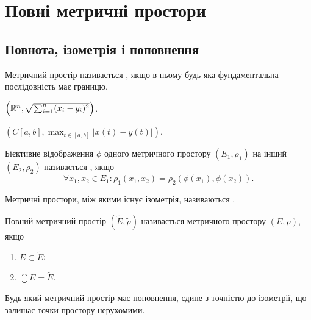 \chapter{Повні метричні простори}

\section{Повнота, ізометрія і поповнення}

\begin{definition}
Метричний простір називається , якщо
в ньому будь-яка фундаментальна послідовність має
границю.
\end{definition}

\begin{example}
$\left( \mathbb{R}^n, \sqrt{\sum_{i = 1}^n (x_i - y_i)^2} \right)$.
\end{example}

\begin{example}
$\left( C[a, b], \max_{t \in [a, b]} |x(t) - y(t)| \right)$.
\end{example}

\begin{definition}
Бієктивне відображення $\phi$ одного метричного
простору $(E_1, \rho_1)$ на інший $(E_2, \rho_2)$ називається
, якщо
\begin{equation*}
    \forall x_1, x_2 \in E_1: \rho_1(x_1, x_2) = \rho_2(\phi(x_1), \phi(x_2)).
\end{equation*}
\end{definition}

\begin{definition}
Метричні простори, між якими існує
ізометрія, називаються .
\end{definition}

\begin{definition}
Повний метричний простір $(\tilde E, \tilde \rho)$ називається
 метричного простору $(E, \rho)$, якщо
\begin{enumerate}
    \item $E \subset \tilde E$;
    \item $\closure E = \tilde{E}$.
\end{enumerate}
\end{definition}

\begin{theorem}
Будь-який метричний простір має поповнення,
єдине з точністю до ізометрії, що залишає точки простору
нерухомими.
\end{theorem}

